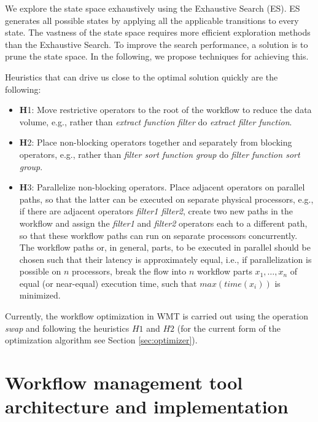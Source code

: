\documentclass[12pt,openany,onecolumn]{book}
\begin{document}
We explore the state space exhaustively using the Exhaustive Search (ES). ES generates all possible states by applying all the applicable transitions to every state. The vastness of the state space requires more efficient exploration methods than the Exhaustive Search. To improve the search performance, a solution is to prune the state space. In the following, we propose techniques for achieving this.

Heuristics that can drive us close to the optimal solution quickly are the following:
\begin{itemize}
\item{\textbf H1:} Move restrictive operators to the root of the workflow to reduce the data volume, e.g., rather than \emph{extract \textrightarrow function \textrightarrow filter} do \emph{extract \textrightarrow filter \textrightarrow function}.
\item{\textbf H2:} Place non-blocking operators together and separately from blocking operators, e.g., rather than \emph{filter \textrightarrow sort \textrightarrow function \textrightarrow group} do \emph{filter \textrightarrow function \textrightarrow sort \textrightarrow group}.
\item{\textbf H3:} Parallelize non-blocking operators. Place adjacent operators on parallel paths, so that the latter can be executed on separate physical processors, e.g., if there are adjacent operators \emph{filter1 \textrightarrow filter2}, create two new paths in the workflow and  assign the \emph{filter1} and \emph{filter2} operators each to a different path, so that these workflow paths can run on separate processors concurrently. The workflow paths or, in general, parts, to be executed in parallel should be chosen such that their latency is approximately equal, i.e., if parallelization is possible on $n$ processors, break the flow into $n$ workflow parts $x_1, \ldots, x_n$ of equal (or near-equal) execution time, such that $max(time(x_i))$ is minimized.
\end{itemize}

Currently, the workflow optimization in WMT is carried out using the operation \emph{swap} and following the heuristics $H1$ and $H2$ (for the current form of the optimization algorithm see Section \ref{sec:optimizer}). 

\chapter{Workflow management tool architecture and implementation}\label{chapt:architect}
\end{document}
